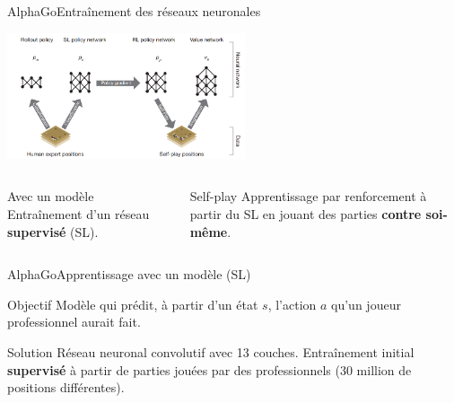 \begin{frame}{AlphaGo}{Entraînement des réseaux neuronales}
    \begin{center}
        \includegraphics[width=7cm]{ressources/AlphaGo/Entrainement}
        \begin{columns}[t]
            \begin{column}{.4\textwidth}
                \begin{block}{Avec un modèle}
                    Entraînement d'un réseau \textbf{supervisé} (SL).
                \end{block}
            \end{column}
            \begin{column}{.4\textwidth}
                \begin{block}{Self-play}
                    Apprentissage par renforcement à partir du SL en jouant des parties \textbf{contre soi-même}.
                \end{block}
            \end{column}
        \end{columns}

    \end{center}
\end{frame}


\begin{frame}{AlphaGo}{Apprentissage avec un modèle (SL)}
    \begin{center}

        \begin{block}{Objectif}
            Modèle qui prédit, à partir d'un état $s$, l'action $a$ qu'un joueur professionnel aurait fait.
        \end{block}
        \vspace{1cm}
        \begin{block}{Solution}
            Réseau neuronal convolutif avec 13 couches.
            Entraînement initial \textbf{supervisé} à partir de parties jouées par des professionnels (30 million de positions différentes).
        \end{block}
    \end{center}
\end{frame}


